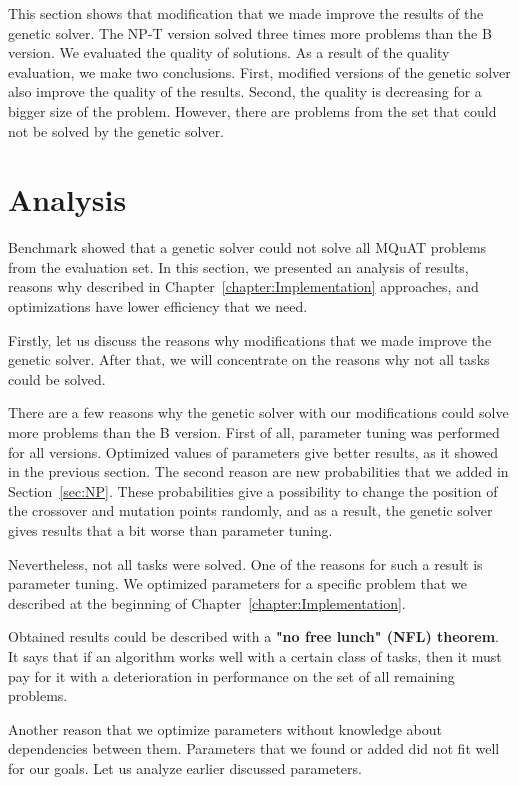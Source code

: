 This section shows that modification that we made improve the results of the genetic solver. The NP-T version solved three times more problems than the B version. We evaluated the quality of solutions. As a result of the quality evaluation, we make two conclusions. First, modified versions of the genetic solver also improve the quality of the results. Second, the quality is decreasing for a bigger size of the problem.
However, there are problems from the set that could not be solved by the genetic solver.


\section{Analysis}

Benchmark showed that a genetic solver could not solve all MQuAT problems from the evaluation set.
In this section, we presented an analysis of results, reasons why described in Chapter~\ref{chapter:Implementation} approaches, and optimizations have lower efficiency that we need.

Firstly, let us discuss the reasons why modifications that we made improve the genetic solver. After that, we will concentrate on the reasons why not all tasks could be solved.

There are a few reasons why the genetic solver with our modifications could solve more problems than the B version. First of all, parameter tuning was performed for all versions. Optimized values of parameters give better results, as it showed in the previous section. The second reason are new probabilities that we added in Section~\ref{sec:NP}. These probabilities give a possibility to change the position of the crossover and mutation points randomly, and as a result, the genetic solver gives results that a bit worse than parameter tuning. 

Nevertheless, not all tasks were solved. One of the reasons for such a result is parameter tuning. We optimized parameters for a specific problem that we described at the beginning of Chapter~\ref{chapter:Implementation}.

Obtained results could be described with a \textbf{"no free lunch" (NFL) theorem}\cite{wolpert1996, wolpert1997}. It says that if an algorithm works well with a certain class of tasks, then it must pay for it with a deterioration in performance on the set of all remaining problems.

Another reason that we optimize parameters without knowledge about dependencies between them. Parameters that we found or added did not fit well for our goals. Let us analyze earlier discussed parameters.

